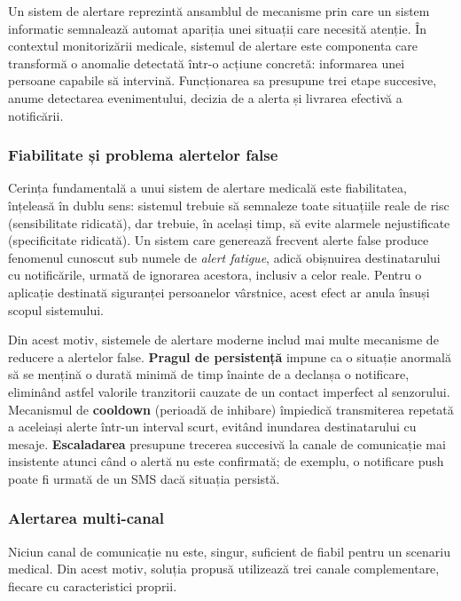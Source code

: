 \documentclass[12pt,a4paper,twoside]{article}
\begin{document}
Un sistem de alertare reprezintă ansamblul de mecanisme prin care un sistem informatic semnalează automat apariția unei situații care necesită atenție. În contextul monitorizării medicale, sistemul de alertare este componenta care transformă o anomalie detectată într-o acțiune concretă: informarea unei persoane capabile să intervină. Funcționarea sa presupune trei etape succesive, anume detectarea evenimentului, decizia de a alerta și livrarea efectivă a notificării.

\subsubsection{Fiabilitate și problema alertelor false}

Cerința fundamentală a unui sistem de alertare medicală este fiabilitatea, înțeleasă în dublu sens: sistemul trebuie să semnaleze toate situațiile reale de risc (sensibilitate ridicată), dar trebuie, în același timp, să evite alarmele nejustificate (specificitate ridicată). Un sistem care generează frecvent alerte false produce fenomenul cunoscut sub numele de \textit{alert fatigue}, adică obișnuirea destinatarului cu notificările, urmată de ignorarea acestora, inclusiv a celor reale. Pentru o aplicație destinată siguranței persoanelor vârstnice, acest efect ar anula însuși scopul sistemului.

Din acest motiv, sistemele de alertare moderne includ mai multe mecanisme de reducere a alertelor false. \textbf{Pragul de persistență} impune ca o situație anormală să se mențină o durată minimă de timp înainte de a declanșa o notificare, eliminând astfel valorile tranzitorii cauzate de un contact imperfect al senzorului. Mecanismul de \textbf{cooldown} (perioadă de inhibare) împiedică transmiterea repetată a aceleiași alerte într-un interval scurt, evitând inundarea destinatarului cu mesaje. \textbf{Escaladarea} presupune trecerea succesivă la canale de comunicație mai insistente atunci când o alertă nu este confirmată; de exemplu, o notificare push poate fi urmată de un SMS dacă situația persistă.

\subsubsection{Alertarea multi-canal}

Niciun canal de comunicație nu este, singur, suficient de fiabil pentru un scenariu medical. Din acest motiv, soluția propusă utilizează trei canale complementare, fiecare cu caracteristici proprii.
\end{document}
